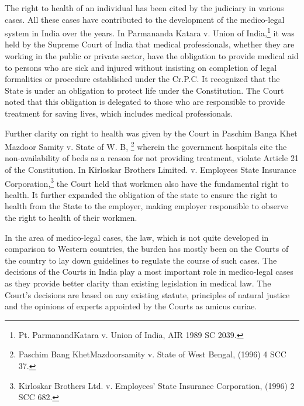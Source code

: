 \begin{multicols}{2}
\vspace{-.15cm}


\vspace{-.1cm}

\noi
The right to health of an individual has been cited by the judiciary in various cases. All these
cases have contributed to the development of the medico-legal system in India over the years. In
Parmananda Katara v. Union of India,\footnote{Pt. ParmanandKatara v. Union of India, AIR 1989 SC 2039.} it was held by the Supreme Court of India that medical professionals, whether they are working in the public or private sector, have the obligation to provide medical aid to persons who are sick and injured without insisting on completion of legal formalities or procedure established under the Cr.P.C. It recognized that the State is under an obligation to protect life under the Constitution. The Court noted that this obligation is delegated to those who are responsible to provide treatment for saving lives, which includes medical professionals.

\vspace{-.1cm}

\noi
Further clarity on right to health was given by the Court in Paschim Banga Khet Mazdoor Samity
v. State of W. B, \footnote{Paschim Bang KhetMazdoorsamity v. State of West Bengal, (1996) 4 SCC 37.} wherein the government hospitals cite the non-availability of beds as a reason for not providing treatment, violate Article 21 of the Constitution. In Kirloskar Brothers Limited. v. Employees State Insurance Corporation,\footnote{Kirloskar Brothers Ltd. v. Employees' State Insurance Corporation, (1996) 2 SCC 682.} the Court held that workmen also have the
fundamental right to health. It further expanded the obligation of the state to ensure the right to
health from the State to the employer, making employer responsible to observe the right to health
of their workmen.

\noi
In the area of medico-legal cases, the law, which is not quite developed in comparison to Western
countries, the burden has mostly been on the Courts of the country to lay down guidelines to
regulate the course of such cases. The decisions of the Courts in India play a most important role
in medico-legal cases as they provide better clarity than existing legislation in medical law. The Court’s decisions are based on any existing statute, principles of natural justice and the opinions
of experts appointed by the Courts as amicus curiae.


\end{multicols}
